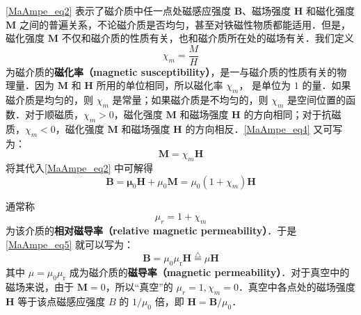 \autoref{MaAmpe_eq2} 表示了磁介质中任一点处磁感应强度 $\mathbf B$、磁场强度 $\mathbf H$ 和磁化强度 $\mathbf M $ 之间的普遍关系，不论磁介质是否均匀，甚至对铁磁性物质都能适用．但是，磁化强度 $\mathbf M $ 不仅和磁介质的性质有关，也和磁介质所在处的磁场有关．我们定义
\begin{equation} \label{MaAmpe_eq4}
\chi_{m}=\frac{M}{H}
\end{equation}
为磁介质的\textbf{磁化率（magnetic susceptibility）}，是一与磁介质的性质有关的物理量．因为 $\mathbf M $ 和 $\mathbf H $ 所用的单位相同，所以磁化率 $\chi_m$， 是单位为 $1 $ 的量．如果磁介质是均匀的，则 $\chi_m$ 是常量；如果磁介质是不均匀的，则 $\chi_m$ 是空间位置的函数．对于顺磁质，$\chi_m>0$，磁化强度 $\mathbf M $ 和磁场强度 $\mathbf H $ 的方向相同；对于抗磁质，$\chi_m<0$，磁化强度 $\mathbf M $ 和磁场强度 $\mathbf H $ 的方向相反．\autoref{MaAmpe_eq4} 又可写为：
\begin{equation} \label{MaAmpe_eq5}
\mathbf M = \chi_m\mathbf H
\end{equation}
将其代入\autoref{MaAmpe_eq2} 中可解得
\begin{equation}
\mathbf{B}=\mathbf{\mu}_{0} \mathbf{H}+\mu_{0} \mathbf{M}=\mu_{0}\left(1+\chi_{{m}}\right) \mathbf{H}
\end{equation}

通常称
\begin{equation}
\mu_{{r}}=1+\chi_{m}
\end{equation}
为该介质的\textbf{相对磁导率（relative magnetic permeability）}．于是\autoref{MaAmpe_eq5} 就可以写为：
\begin{equation}
\mathbf B=\mu_{0} \mu_{\mathrm{r}} \mathbf H\overset{\triangle}=\mu \mathbf H
\end{equation}
其中 $\mu = \mu_{0} \mu_{\mathrm{r}} $ 成为磁介质的\textbf{磁导率（magnetic permeability）}．对于真空中的磁场来说，由于 $\mathbf M=0$，所以“真空”的 $\mu_r=1,\chi_m=0$．真空中各点处的磁场强度 $\mathbf H $ 等于该点磁感应强度 $B $ 的 $1/\mu_0$ 倍，即 $\mathbf H = \mathbf B / \mu_0$．